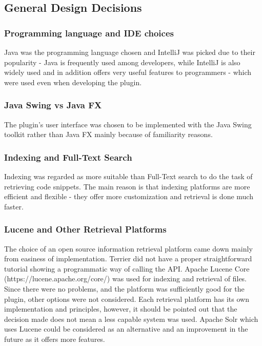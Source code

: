 \documentclass{l4proj}
\begin{document}
\subsection{General Design Decisions}

\subsubsection{Programming language and IDE choices}
Java was the programming language chosen and IntelliJ was picked due to their popularity - Java is frequently used among developers, while IntelliJ is also widely used and in addition offers very useful features to programmers - which were used even when developing the plugin.

\subsubsection{Java Swing vs Java FX}
The plugin's user interface was chosen to be implemented with the Java Swing toolkit rather than Java FX mainly because of familiarity reasons.

\subsubsection{Indexing and Full-Text Search}
Indexing was regarded as more suitable than Full-Text search to do the task of retrieving code snippets. The main reason is that indexing platforms are more efficient and flexible - they offer more customization and retrieval is done much faster.

\subsubsection{Lucene and Other Retrieval Platforms}
The choice of an open source information retrieval platform came down mainly from easiness of implementation. Terrier did not have a proper straightforward tutorial showing a programmatic way of calling the API. Apache Lucene Core (https://lucene.apache.org/core/) was used for indexing and retrieval of files. Since there were no problems, and the platform was sufficiently good for the plugin, other options were not considered. Each retrieval platform has its own implementation and principles, however, it should be pointed out that the decision made does not mean a less capable system was used. Apache Solr which uses Lucene could be considered as an alternative and an improvement in the future as it offers more features.
\end{document}
